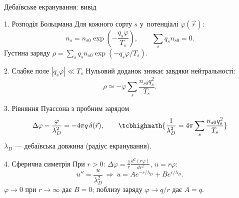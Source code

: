 \documentclass[]{beamer}
\begin{document}
\begin{frame}{Дебаївське екранування: вивід}
	\begin{overprint}
		\begin{block}{1. Розподіл Больцмана}\justifying\small
			Для кожного сорту $s$ у~потенціалі $\varphi(\vec r)$:
			\begin{equation*}
				n_s=n_{s0}\exp\left(-\frac{q_s\varphi}{T_s}\right),\qquad\sum_sq_sn_{s0}=0.
			\end{equation*}
			Густина заряду $\rho=\sum_sq_sn_{s0}\exp(-q_s\varphi/T_s)$.
		\end{block}
		\begin{block}{2. Слабке поле $|q_s\varphi|\ll T_s$}\justifying\small
			Нульовий доданок зникає завдяки нейтральності:
			\begin{equation*}
				\rho\simeq-\varphi\sum_s\frac{n_{s0}q_s^2}{T_s}.
			\end{equation*}
		\end{block}
		\begin{block}{3. Рівняння Пуассона з пробним зарядом}\justifying\small
			\begin{equation*}
				\Delta\varphi-\frac{\varphi}{\lambda_D^2}=-4\pi q\,\delta(\vec r),\qquad
				\tcbhighmath{\frac{1}{\lambda_D^2}=4\pi\sum_s\frac{n_{s0}q_s^2}{T_s}}
			\end{equation*}
			$\lambda_D$ --- \alert{дебаївська довжина} (радіус екранування).
		\end{block}
		\begin{block}{4. Сферична симетрія}\justifying\small
			При $r>0$: $\Delta\varphi=\frac1r\frac{d^2(r\varphi)}{dr^2}$, $u=r\varphi$:
			\begin{equation*}
				u''=\frac{u}{\lambda_D^2}\ \Rightarrow\ u=Ae^{-r/\lambda_D}+Be^{r/\lambda_D}.
			\end{equation*}
			$\varphi\to0$ при $r\to\infty$ дає $B=0$; поблизу заряду $\varphi\to q/r$ дає $A=q$.
		\end{block}
	\end{overprint}
\end{frame}
\end{document}

